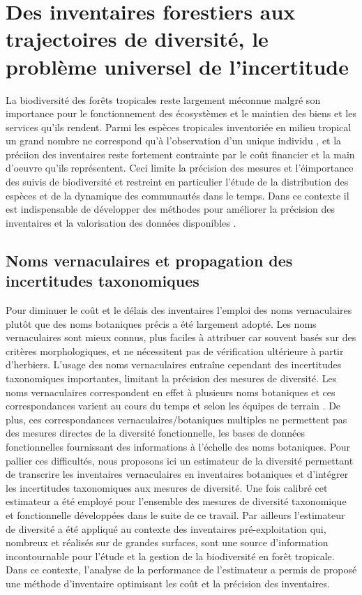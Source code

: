 \documentclass[
  11pt,
  french,
  A4paper,
  extrafontsizes,onecolumn,openright
  ]{memoir}
\begin{document}
\chapter{Des inventaires forestiers aux trajectoires de diversité, le
problème universel de
l'incertitude}\label{des-inventaires-forestiers-aux-trajectoires-de-diversite-le-probleme-universel-de-lincertitude}

La biodiversité des forêts tropicales reste largement méconnue malgré
son importance pour le fonctionnement des écosystèmes et le maintien des
biens et les services qu'ils rendent. Parmi les espèces tropicales
inventoriée en milieu tropical un grand nombre ne correspond qu'à
l'observation d'un unique individu \autocite{Feeley2011}, et la préciion
des inventaires reste fortement contrainte par le coût financier et la
main d'oeuvre qu'ils représentent. Ceci limite la précision des mesures
et l'éimportance des suivis de biodiversité et restreint en particulier
l'étude de la distribution des espèces et de la dynamique des
communautés dans le temps. Dans ce contexte il est indispensable de
développer des méthodes pour améliorer la précision des inventaires et
la valorisation des données disponibles \autocite{Baraloto2012}.

\section{Noms vernaculaires et propagation des incertitudes
taxonomiques}\label{noms-vernaculaires-et-propagation-des-incertitudes-taxonomiques}

Pour diminuer le coût et le délais des inventaires l'emploi des noms
vernaculaires plutôt que des noms botaniques précis a été largement
adopté. Les noms vernaculaires sont mieux connus, plus faciles à
attribuer car souvent basés sur des critères morphologiques, et ne
nécessitent pas de vérification ultérieure à partir d'herbiers. L'usage
des noms vernaculaires entraîne cependant des incertitudes taxonomiques
importantes, limitant la précision des mesures de diversité. Les noms
vernaculaires correspondent en effet à plusieurs noms botaniques et ces
correspondances varient au cours du temps et selon les équipes de
terrain \autocite{Oldeman1968}. De plus, ces correspondances
vernaculaires/botaniques multiples ne permettent pas des mesures
directes de la diversité fonctionnelle, les bases de données
fonctionnelles fournissant des informations à l'échelle des noms
botaniques. Pour pallier ces difficultés, nous proposons ici un
estimateur de la diversité permettant de transcrire les inventaires
vernaculaires en inventaires botaniques et d'intégrer les incertitudes
taxonomiques aux mesures de diversité. Une fois calibré cet estimateur a
été employé pour l'ensemble des mesures de diversité taxonomique et
fonctionnelle développées dans le suite de ce travail. Par ailleurs
l'estimateur de diversité a été appliqué au contexte des inventaires
pré-exploitation qui, nombreux et réalisés sur de grandes surfaces, sont
une source d'information incontournable
\autocites{terSteege2000}{Guitet2014} pour l'étude et la gestion de la
biodiversité en forêt tropicale. Dans ce contexte, l'analyse de la
performance de l'estimateur a permis de proposé une méthode d'inventaire
optimisant les coût et la précision des inventaires.
\end{document}
